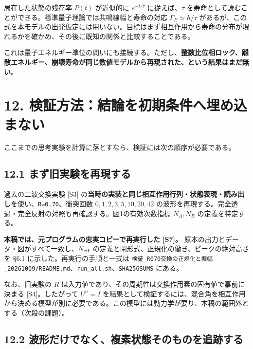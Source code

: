 \documentclass[
  a4paper,
]{ltjsarticle}
\begin{document}
局在した状態の残存率 \(P(t)\) が近似的に \(e^{-t/\tau}\)
に従えば、\(\tau\)
を寿命として読むことができる。標準量子理論では共鳴線幅と寿命の対応
\(\Gamma_E\simeq\hbar/\tau\)
があるが、この式を本モデルの出発仮定には用いない。目標はまず相互作用から寿命の分布が現れるかを確かめ、その後に既知の関係と比較することである。

これは量子エネルギー準位の問いにも接続する。ただし、\textbf{整数比位相ロック、離散エネルギー、崩壊寿命が同じ数値モデルから再現された、という結果はまだ無い}。

\section{12.
検証方法：結論を初期条件へ埋め込まない}\label{ux691cux8a3cux65b9ux6cd5ux7d50ux8ad6ux3092ux521dux671fux6761ux4ef6ux3078ux57cbux3081ux8fbcux307eux306aux3044}

ここまでの思考実験を計算に落とすなら、検証には次の順序が必要である。

\subsection{12.1
まず旧実験を再現する}\label{ux307eux305aux65e7ux5b9fux9a13ux3092ux518dux73feux3059ux308b}

過去の二波交換実験 {[}S3{]}
の\textbf{当時の実装と同じ相互作用行列・状態表現・読み出し}を使い、\texttt{R=0.70}、衝突回数
\(0,1,2,3,5,10,20,42\)
の波形を再現する。完全透過・完全反射の対照も再確認する。図1の有効次数指標
\(N_A,N_B\) の定義を特定する。

\textbf{本稿では、元プログラムの忠実コピーで再実行した {[}S7{]}。}
原本の出力とデータ・図がすべて一致し、\(N_{\rm eff}\)
の定義と閉形式、正規化の働き、ピークの絶対高さを §6.1
に示した。再実行の手順と一式は
\texttt{検証\_\allowbreak{}R070交換の正規化と振幅\_\allowbreak{}20261009/\allowbreak{}README.md}、\texttt{run\_\allowbreak{}all.sh}、\texttt{SHA256SUMS}
にある。

なお、旧実験の \(R\)
は入力値であり、その周期性は交換作用素の固有値で事前に決まる
{[}S4{]}。したがって \(U^n=I\)
を結果として検証するには、混合角を相互作用から決める模型が別に必要である。この模型には動力学が要り、本稿の範囲外とする（次段の課題）。

\subsection{12.2
波形だけでなく、複素状態そのものを追跡する}\label{ux6ce2ux5f62ux3060ux3051ux3067ux306aux304fux8907ux7d20ux72b6ux614bux305dux306eux3082ux306eux3092ux8ffdux8de1ux3059ux308b}
\end{document}
